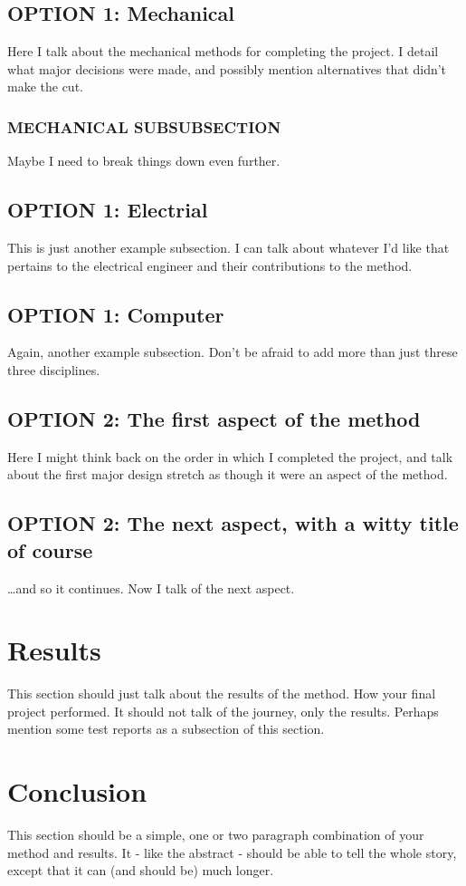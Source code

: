 \documentclass[conference]{IEEEtran}
\begin{document}
\subsection{OPTION 1: Mechanical}
Here I talk about the mechanical methods for completing the project. I detail what major decisions were made, and possibly mention alternatives that didn't make the cut.

\subsubsection{MECHANICAL SUBSUBSECTION}
Maybe I need to break things down even further.

\subsection{OPTION 1: Electrial}
This is just another example subsection. I can talk about whatever I'd like that pertains to the electrical engineer and their contributions to the method.

\subsection{OPTION 1: Computer}
Again, another example subsection. Don't be afraid to add more than just threse three disciplines.

\subsection{OPTION 2: The first aspect of the method}
Here I might think back on the order in which I completed the project, and talk about the first major design stretch as though it were an aspect of the method.

\subsection{OPTION 2: The next aspect, with a witty title of course}
\ldots and so it continues. Now I talk of the next aspect.

\section{Results}
This section should just talk about the results of the method. How your final project performed. It should not talk of the journey, only the results. Perhaps mention some test reports as a subsection of this section.

\section{Conclusion}
This section should be a simple, one or two paragraph combination of your method and results. It - like the abstract - should be able to tell the whole story, except that it can (and should be) much longer. 
\end{document}
